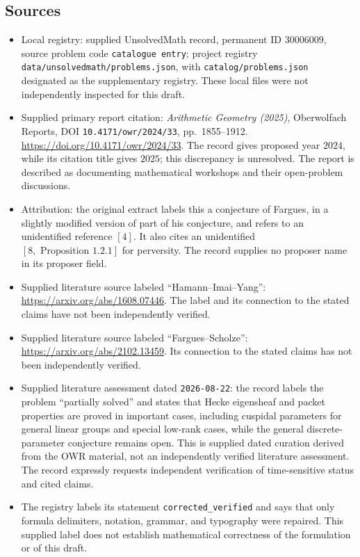 \documentclass[11pt]{article}
\begin{document}
\subsection{Sources}
\begin{itemize}
\item Local registry: supplied UnsolvedMath record, permanent ID \(30006009\), source problem code \texttt{catalogue entry}; project registry \texttt{data/unsolvedmath/problems.json}, with \texttt{catalog/problems.json} designated as the supplementary registry. These local files were not independently inspected for this draft.
\item Supplied primary report citation: \emph{Arithmetic Geometry (2025)}, Oberwolfach Reports, DOI \texttt{10.4171/owr/2024/33}, pp.\ 1855--1912. \url{https://doi.org/10.4171/owr/2024/33}. The record gives proposed year \(2024\), while its citation title gives \(2025\); this discrepancy is unresolved. The report is described as documenting mathematical workshops and their open-problem discussions.
\item Attribution: the original extract labels this a conjecture of Fargues, in a slightly modified version of part of his conjecture, and refers to an unidentified reference \([4]\). It also cites an unidentified \([8,\text{ Proposition }1.2.1]\) for perversity. The record supplies no proposer name in its proposer field.
\item Supplied literature source labeled ``Hamann--Imai--Yang'': \url{https://arxiv.org/abs/1608.07446}. The label and its connection to the stated claims have not been independently verified.
\item Supplied literature source labeled ``Fargues--Scholze'': \url{https://arxiv.org/abs/2102.13459}. Its connection to the stated claims has not been independently verified.
\item Supplied literature assessment dated \texttt{2026-08-22}: the record labels the problem ``partially solved'' and states that Hecke eigensheaf and packet properties are proved in important cases, including cuspidal parameters for general linear groups and special low-rank cases, while the general discrete-parameter conjecture remains open. This is supplied dated curation derived from the OWR material, not an independently verified literature assessment. The record expressly requests independent verification of time-sensitive status and cited claims.
\item The registry labels its statement \texttt{corrected\_verified} and says that only formula delimiters, notation, grammar, and typography were repaired. This supplied label does not establish mathematical correctness of the formulation or of this draft.
\end{itemize}
\end{document}

